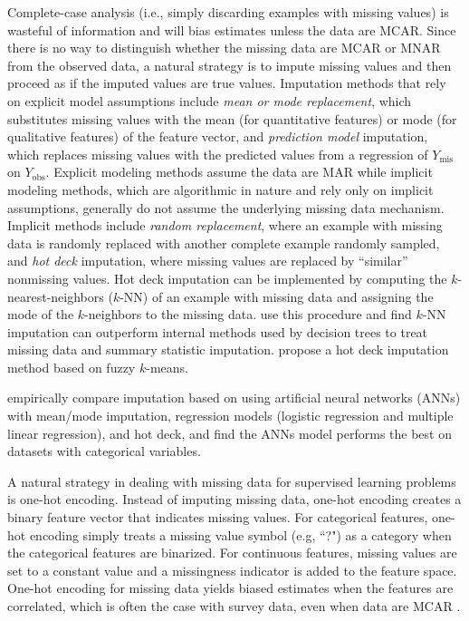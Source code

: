 \documentclass[10pt]{book}
\theoremstyle{definition}
\begin{document}
Complete-case analysis (i.e., simply discarding examples with missing values) is wasteful of information and will bias estimates unless the data are MCAR. Since there is no way to distinguish whether the missing data are MCAR or MNAR from the observed data, a natural strategy is to impute missing values and then proceed as if the imputed values are true values. Imputation methods that rely on explicit model assumptions include \emph{mean or mode replacement}, which substitutes missing values with the mean (for quantitative features) or mode (for qualitative features) of the feature vector, and \emph{prediction model} imputation, which replaces missing values with the predicted values from a regression of $Y_{\mathrm{mis}}$ on $Y_{\mathrm{obs}}$. Explicit modeling methods assume the data are MAR while implicit modeling methods, which are algorithmic in nature and rely only on implicit assumptions, generally do not assume the underlying missing data mechanism. Implicit methods include \emph{random replacement}, where an example with missing data is randomly replaced with another complete example randomly sampled, and \emph{hot deck} imputation, where missing values are replaced by ``similar'' nonmissing values. Hot deck imputation can be implemented by computing the $k$-nearest-neighbors ($k$-NN) of an example with missing data and assigning the mode of the $k$-neighbors to the missing data. \citep{batista2003analysis} use this procedure and find $k$-NN imputation can outperform internal methods used by decision trees to treat missing data and summary statistic imputation. \citep{li2004} propose a hot deck imputation method based on fuzzy $k$-means. 

\citep{silva2011} empirically compare imputation based on using artificial neural networks (ANNs) with mean/mode  imputation, regression models (logistic regression and multiple linear regression), and hot deck, and find the ANNs model performs the best on datasets with categorical variables. 

\par
{} 

A natural strategy in dealing with missing data for supervised learning problems is one-hot encoding. Instead of imputing missing data, one-hot encoding creates a binary feature vector that indicates missing values. For categorical features, one-hot encoding simply treats a missing value symbol (e.g, ``?") as a category when the categorical features are binarized. For continuous features, missing values are set to a constant value and a missingness indicator is added to the feature space. One-hot encoding for missing data yields biased estimates when the features are correlated, which is often the case with survey data, even when data are MCAR \citep{jones1996}. 
\end{document}
